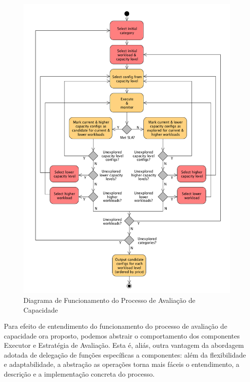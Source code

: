 \begin{figure}[htb]
  \caption{\label{fig_processo_aval_capacidade}Diagrama de Funcionamento do Processo de Avaliação de Capacidade}
  \begin{center}
    \includegraphics[scale=0.4]{img/diagrama-avaliacao-capacidade-v14}
  \end{center}
\end{figure}

Para efeito de entendimento do funcionamento do processo de avaliação de capacidade
ora proposto, podemos abstrair o comportamento dos componentes Executor e 
Estratégia de Avaliação. Esta é, aliás, outra vantagem da abordagem adotada de 
delegação de funções específicas a componentes: além da flexibilidade e 
adaptabilidade, a abstração as operações torna mais fáceis o entendimento, a 
descrição e a implementação concreta do processo.   

